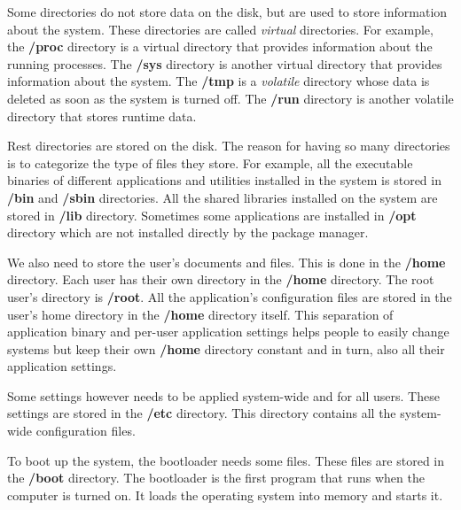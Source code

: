 Some directories do not store data on the disk, but are used to store information about the system.
These directories are called \textit{virtual} directories.
For example, the \textbf{/proc} directory is a virtual directory that provides information about the running processes.
The \textbf{/sys} directory is another virtual directory that provides information about the system.
The \textbf{/tmp} is a \textit{volatile} directory whose data is deleted as soon as the system is turned off.
The \textbf{/run} directory is another volatile directory that stores runtime data.

Rest directories are stored on the disk.
The reason for having so many directories is to categorize the type of files they store.
For example, all the executable binaries of different applications and utilities installed in the system is stored in \textbf{/bin} and \textbf{/sbin} directories.
All the shared libraries installed on the system are stored in \textbf{/lib} directory.
Sometimes some applications are installed in \textbf{/opt} directory which are not installed directly by the package manager.

We also need to store the user's documents and files.
This is done in the \textbf{/home} directory.
Each user has their own directory in the \textbf{/home} directory.
The root user's directory is \textbf{/root}.
All the application's configuration files are stored in the user's home directory in the \textbf{/home} directory itself.
This separation of application binary and per-user application settings helps people to easily change systems but keep their own \textbf{/home} directory constant and in turn, also all their application settings.

Some settings however needs to be applied system-wide and for all users.
These settings are stored in the \textbf{/etc} directory.
This directory contains all the system-wide configuration files.

To boot up the system, the bootloader needs some files. These files are stored in the \textbf{/boot} directory.
The bootloader is the first program that runs when the computer is turned on. It loads the operating system into memory and starts it.

